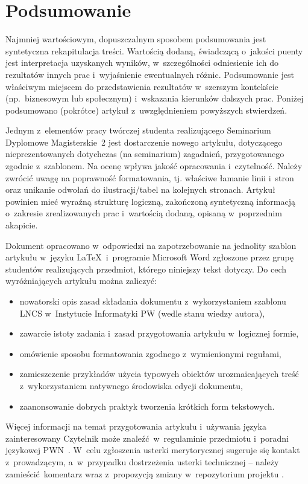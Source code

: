 \section{Podsumowanie}
\label{sec:summary}

Najmniej wartościowym, dopuszczalnym sposobem podsumowania jest syntetyczna rekapitulacja treści. Wartością dodaną, świadczącą o~jakości puenty jest interpretacja uzyskanych wyników, w~szczególności odniesienie ich do rezultatów innych prac i~wyjaśnienie ewentualnych różnic. Podsumowanie jest właściwym miejscem do przedstawienia rezultatów w~szerszym kontekście (np.~biznesowym lub społecznym) i~wskazania kierunków dalszych prac. Poniżej podsumowano (pokrótce) artykuł z~uwzględnieniem powyższych stwierdzeń.

Jednym z~elementów pracy twórczej studenta realizującego Seminarium Dyplomowe Magisterskie~2 jest dostarczenie nowego artykułu, dotyczącego nieprezentowanych dotychczas (na seminarium) zagadnień, przygotowanego zgodnie z~szablonem. Na ocenę wpływa jakość opracowania i~czytelność. Należy zwrócić uwagę na poprawność formatowania, tj. właściwe łamanie linii i~stron oraz unikanie odwołań do ilustracji/tabel na kolejnych stronach. Artykuł powinien mieć wyraźną strukturę logiczną, zakończoną syntetyczną informacją o~zakresie zrealizowanych prac i~wartością dodaną, opisaną w~poprzednim akapicie.

Dokument opracowano w~odpowiedzi na zapotrzebowanie na jednolity szablon artykułu w~języku \LaTeX~i~programie Microsoft Word zgłoszone przez grupę studentów realizujących przedmiot, którego niniejszy tekst dotyczy. Do cech wyróżniających artykułu można zaliczyć:

\begin{itemize}
	\item nowatorski opis zasad składania dokumentu z~wykorzystaniem szablonu LNCS w~Instytucie Informatyki PW (wedle stanu wiedzy autora),
	\item zawarcie istoty zadania i~zasad przygotowania artykułu w~logicznej formie,
	\item omówienie sposobu formatowania zgodnego z~wymienionymi regułami,
	\item zamieszczenie przykładów użycia typowych obiektów urozmaicających treść z~wykorzystaniem natywnego środowiska edycji dokumentu,
	\item zaanonsowanie dobrych praktyk tworzenia krótkich form tekstowych.
\end{itemize}

Więcej informacji na temat przygotowania artykułu i~używania języka zainteresowany Czytelnik może znaleźć w~regulaminie przedmiotu i~poradni językowej PWN~\cite{ref:pwn}. W~celu zgłoszenia usterki merytorycznej sugeruje się kontakt z~prowadzącym, a~w~przypadku dostrzeżenia usterki technicznej -- należy zamieścić komentarz wraz z~propozycją zmiany w~repozytorium projektu \cite{ref:github}.
